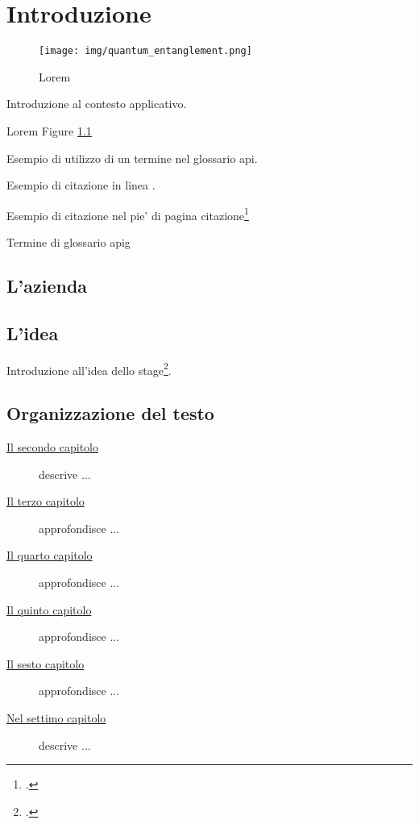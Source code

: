 \chapter{Introduzione}
\label{cap:introduzione}

\begin{figure}[h!]
    \centering
    \texttt{[image: img/quantum\_entanglement.png]}
    \caption{Lorem}
    \label{fig:entanglement}
\end{figure}

Introduzione al contesto applicativo.

Lorem Figure \ref{fig:entanglement}

Esempio di utilizzo di un termine nel glossario \gls{api}.

Esempio di citazione in linea
\cite{site:agile-manifesto}.

Esempio di citazione nel pie' di pagina
citazione\footcite{womak:lean-thinking}

Termine di glossario \gls{apig}

\lipsum[1-2]

\section{L'azienda}

\lipsum[1]

\section{L'idea}

Introduzione all'idea dello stage\footcite{article:spooky}.
\lipsum[1-3]

\section{Organizzazione del testo}

\begin{description}
    \item[{\hyperref[cap:processi-metodologie]{Il secondo capitolo}}] descrive ...
    
    \item[{\hyperref[cap:descrizione-stage]{Il terzo capitolo}}] approfondisce ...
    
    \item[{\hyperref[cap:analisi-requisiti]{Il quarto capitolo}}] approfondisce ...
    
    \item[{\hyperref[cap:progettazione-codifica]{Il quinto capitolo}}] approfondisce ...
    
    \item[{\hyperref[cap:verifica-validazione]{Il sesto capitolo}}] approfondisce ...
    
    \item[{\hyperref[cap:conclusioni]{Nel settimo capitolo}}] descrive ...
\end{description}

